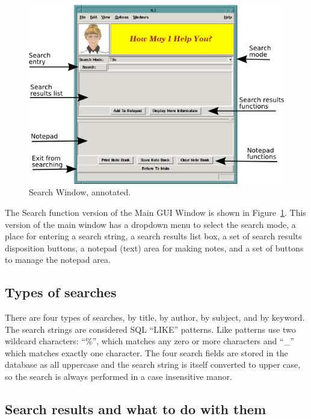 \begin{figure}[hpt]
\begin{centering}
\includegraphics[width=5in]{SearchWindowAnnotated.png}
\caption{Search Window, annotated.}
\label{fig:ref:searchwindowAnno}
\end{centering}
\end{figure}
The Search function version of the Main GUI Window is shown in
Figure~\ref{fig:ref:searchwindowAnno}. This version of the main window
has a dropdown menu to select the search mode, a place for entering a
search string, a search results list box, a set of search results
disposition buttons, a notepad (text) area for making notes, and a set
of buttons to manage the notepad area. 

\subsection{Types of searches}
\label{sect:ref:searchtypes}

There are four types of searches, by title, by author, by subject, and
by keyword. The search strings are considered SQL ``LIKE'' patterns. 
Like patterns use two wildcard characters: ``\%'', which matches any
zero or more characters and ``\_'' which matches exactly one character. 
The four search fields are stored in the database as all uppercase and
the search string is itself converted to upper case, so the search is
always performed in a case insensitive manor. 

\subsection{Search results and what to do with them}

